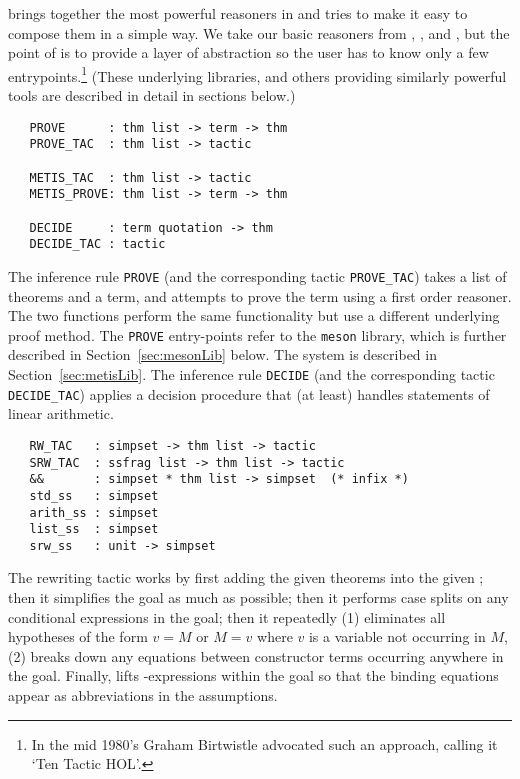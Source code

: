 { brings together the most powerful reasoners in \HOL{} and
tries to make it easy to compose them in a simple way. We take our basic
reasoners from , , and ,
but the point of  is to provide a layer of abstraction so
the user has to know only a few entrypoints.\footnote{In the mid 1980's
Graham Birtwistle advocated such an approach, calling it `Ten Tactic
HOL'.} (These underlying libraries, and others providing similarly
powerful tools are described in detail in sections below.)
\begin{hol}
\begin{verbatim}
   PROVE      : thm list -> term -> thm
   PROVE_TAC  : thm list -> tactic

   METIS_TAC  : thm list -> tactic
   METIS_PROVE: thm list -> term -> thm

   DECIDE     : term quotation -> thm
   DECIDE_TAC : tactic
\end{verbatim}
\end{hol}
The inference rule \texttt{PROVE} (and the corresponding tactic
\texttt{PROVE\_TAC}) takes a list of theorems and a term, and attempts
to prove the term using a first order reasoner.  The two 
functions perform the same functionality but use a different
underlying proof method.  The \texttt{PROVE} entry-points refer to the
\texttt{meson} library, which is further described in
Section~\ref{sec:mesonLib} below. The  system is described
in Section~\ref{sec:metisLib}.  The inference rule \texttt{DECIDE}
(and the corresponding tactic \texttt{DECIDE\_TAC}) applies a decision
procedure that (at least) handles statements of linear arithmetic.

\begin{hol}
\begin{verbatim}
   RW_TAC   : simpset -> thm list -> tactic
   SRW_TAC  : ssfrag list -> thm list -> tactic
   &&       : simpset * thm list -> simpset  (* infix *)
   std_ss   : simpset
   arith_ss : simpset
   list_ss  : simpset
   srw_ss   : unit -> simpset
\end{verbatim}
\end{hol}
%
 The rewriting tactic  works by
first adding the given theorems into the given \simpset; then it
simplifies the goal as much as possible; then it performs case splits
on any conditional expressions in the goal; then it repeatedly (1)
eliminates all hypotheses of the form $v = M$ or $M = v$ where $v$ is
a variable not occurring in $M$, (2) breaks down any equations between
constructor terms occurring anywhere in the goal. Finally,
 lifts -expressions within the goal so that
the binding equations appear as
abbreviations in the
assumptions.

}
